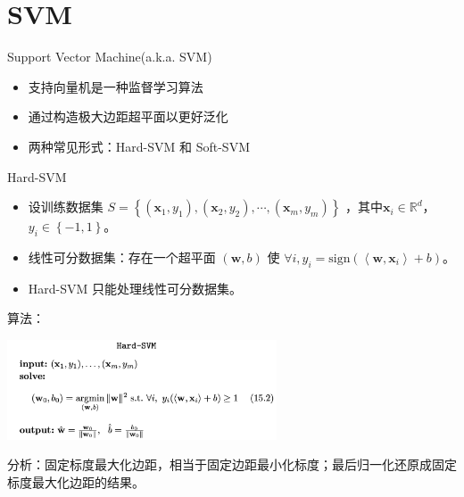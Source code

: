 \section{SVM}

\begin{frame}{Support Vector Machine(a.k.a. SVM)}

\begin{itemize}
    \item 支持向量机是一种监督学习算法
    \item 通过构造极大边距超平面以更好泛化
    \item 两种常见形式：Hard-SVM 和 Soft-SVM
\end{itemize}
\end{frame}

\begin{frame}[fragile]{Hard-SVM}
    \begin{itemize}
        \item 设训练数据集 $S=\left\{ (\mathbf x_1, y_1), (\mathbf x_2, y_2), \cdots, (\mathbf x_m, y_m) \right\} $ ，其中$\mathbf x_i \in \mathbb R^d$，$y_i \in \left\{ -1, 1 \right\} $。
        \item 线性可分数据集：存在一个超平面 $(\mathbf w, b)$ 使 $\forall i, y_i = \text{sign}(\left\langle \mathbf w , \mathbf x_i \right\rangle +b )$。
        \item Hard-SVM 只能处理线性可分数据集。
    \end{itemize}
    算法：
    \begin{center}
        \includegraphics[width=0.6\textwidth]{assets/hsvm.png}
    \end{center}
    分析：固定标度最大化边距，相当于固定边距最小化标度；最后归一化还原成固定标度最大化边距的结果。
    
\end{frame}

